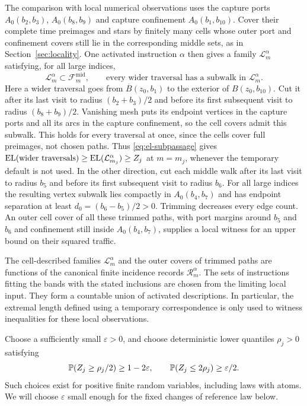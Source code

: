 The comparison with local numerical observations uses the capture ports
\(A_0(b_2,b_3)\), \(A_0(b_8,b_9)\) and capture confinement
\(A_0(b_1,b_{10})\).  Cover their complete time preimages and stars by
finitely many cells whose outer port and confinement covers still lie in
the corresponding middle sets, as in Section~\ref{sec:locality}.
One activated instruction \(\alpha\) then gives a family
\(\mathcal L_m^\alpha\) satisfying, for all large indices,
\begin{equation}\label{eq:band-sandwich}
 \mathcal L_m^\alpha\subset\mathcal F_m^{\mathrm{mid}},
 \qquad
 \text{every wider traversal has a subwalk in }\mathcal L_m^\alpha .
\end{equation}
Here a wider traversal goes from \(\overline B(z_0,b_1)\) to the exterior
of \(B(z_0,b_{10})\).  Cut it after its last visit to radius
\((b_2+b_3)/2\) and before its first subsequent visit to radius
\((b_8+b_9)/2\).  Vanishing mesh puts its endpoint vertices in the capture
ports and all its arcs in the capture confinement, so the cell covers admit
this subwalk.  This holds for every traversal at once, since the cells
cover full preimages, not chosen paths.
Thus \eqref{eq:el-subpassage} gives
\(\operatorname{EL}(\text{wider traversals})\ge\operatorname{EL}(\mathcal L_{m_j}^\alpha)\ge Z_j\)
at \(m=m_j\), whenever the temporary default is not used.
In the other direction, cut each middle walk after its last visit to radius
\(b_5\) and before its first subsequent visit to radius \(b_6\).
For all large indices the resulting vertex subwalk lies compactly in
\(A_0(b_4,b_7)\) and has endpoint separation at least
\(d_0=(b_6-b_5)/2>0\).  Trimming decreases every edge count.  An outer
cell cover of all these trimmed paths, with port margins around \(b_5\)
and \(b_6\) and confinement still inside \(A_0(b_4,b_7)\), supplies a
local witness for an upper bound on their squared traffic.

The cell-described families \(\mathcal L_m^\alpha\) and the outer covers
of trimmed paths are functions of the canonical finite incidence records
\(\mathcal R_m^\alpha\).  The sets of instructions fitting the
bands with the stated inclusions are chosen from the limiting local input.
They form a countable union of activated descriptions.  In particular,
the extremal length defined using a temporary correspondence is only used
to witness inequalities for these local observations.

Choose a sufficiently small \(\varepsilon>0\), and choose deterministic
lower quantiles \(\rho_j>0\) satisfying
\begin{equation}\label{eq:raw-el-quantiles}
 \mathbb P(Z_j\ge\rho_j/2)\ge1-2\varepsilon,
 \qquad
 \mathbb P(Z_j\le2\rho_j)\ge\varepsilon/2 .
\end{equation}
Such choices exist for positive finite random variables, including laws
with atoms.  We will choose \(\varepsilon\) small enough for the fixed
changes of reference law below.

